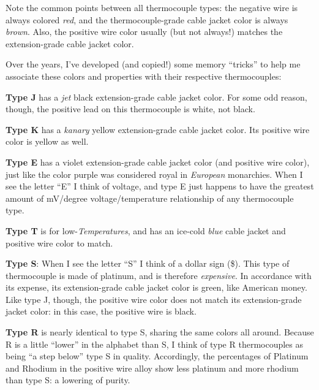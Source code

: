 \vskip 10pt

Note the common points between all thermocouple types: the negative wire is always colored {\it red}, and the thermocouple-grade cable jacket color is always {\it brown}.  Also, the positive wire color usually (but not always!) matches the extension-grade cable jacket color.

Over the years, I've developed (and copied!) some memory ``tricks'' to help me associate these colors and properties with their respective thermocouples:

\vskip 10pt

{\bf Type J} has a {\it jet} black extension-grade cable jacket color.  For some odd reason, though, the positive lead on this thermocouple is white, not black.

\vskip 10pt

{\bf Type K} has a {\it kanary} yellow extension-grade cable jacket color.  Its positive wire color is yellow as well.

\vskip 10pt

{\bf Type E} has a violet extension-grade cable jacket color (and positive wire color), just like the color purple was considered royal in {\it European} monarchies.  When I see the letter ``E'' I think of voltage, and type E just happens to have the greatest amount of mV/degree voltage/temperature relationship of any thermocouple type.

\vskip 10pt

{\bf Type T} is for low-{\it Temperatures}, and has an ice-cold {\it blue} cable jacket and positive wire color to match.

\vskip 10pt

{\bf Type S}: When I see the letter ``S'' I think of a dollar sign (\$).  This type of thermocouple is made of platinum, and is therefore {\it expensive}.  In accordance with its expense, its extension-grade cable jacket color is green, like American money.  Like type J, though, the positive wire color does not match its extension-grade jacket color: in this case, the positive wire is black.

\vskip 10pt

{\bf Type R} is nearly identical to type S, sharing the same colors all around.  Because R is a little ``lower'' in the alphabet than S, I think of type R thermocouples as being ``a step below'' type S in quality.  Accordingly, the percentages of Platinum and Rhodium in the positive wire alloy show less platinum and more rhodium than type S: a lowering of purity. 

